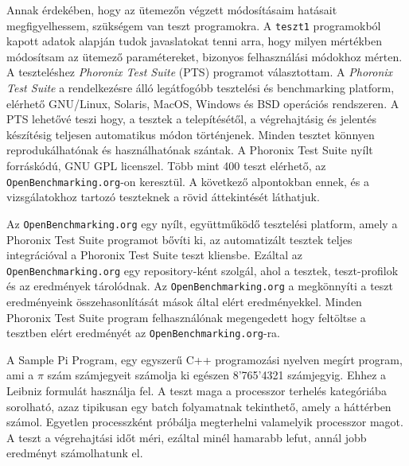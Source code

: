 

Annak érdekében, hogy az ütemezőn végzett módosításaim hatásait megfigyelhessem, szükségem van teszt programokra. A \texttt{teszt1} programokból kapott adatok alapján tudok javaslatokat tenni arra, hogy milyen mértékben módosítsam az ütemező paramétereket, bizonyos felhasználási módokhoz mérten.
A teszteléshez \textit{Phoronix Test Suite} (PTS) programot választottam.
A \textit{Phoronix Test Suite} a rendelkezésre álló legátfogóbb tesztelési és benchmarking platform, elérhető GNU/Linux, Solaris, MacOS, Windows és BSD operációs rendszeren.
A PTS lehetővé teszi hogy, a tesztek a telepítésétől, a végrehajtásig és jelentés készítésig teljesen automatikus módon történjenek.
Minden tesztet könnyen reprodukálhatónak és használhatónak szántak.
A Phoronix Test Suite nyílt forráskódú, GNU GPL licenszel.
Több mint 400 teszt elérhető, az \texttt{OpenBenchmarking.org}-on keresztül.
A következő alpontokban ennek, és a vizsgálatokhoz tartozó teszteknek a rövid áttekintését láthatjuk.


Az \texttt{OpenBenchmarking.org} egy nyílt, együttműködő tesztelési platform, amely a Phoronix Test Suite programot bővíti ki, az automatizált tesztek teljes integrációval a Phoronix Test Suite teszt kliensbe.
Ezáltal az \texttt{OpenBenchmarking.org} egy repository-ként szolgál, ahol a tesztek, teszt-profilok és az eredmények tárolódnak.
Az \texttt{OpenBenchmarking.org} a megkönnyíti a teszt eredményeink összehasonlítását mások által elért eredményekkel.
Minden Phoronix Test Suite program felhasználónak megengedett hogy feltöltse a tesztben elért eredményét az \texttt{OpenBenchmarking.org}-ra.


A  Sample Pi Program, egy egyszerű C++ programozási nyelven megírt program, ami a $\pi$ szám számjegyeit számolja ki egészen 8'765'4321 számjegyig. Ehhez a Leibniz formulát használja fel. A teszt maga a processzor terhelés kategóriába sorolható, azaz tipikusan egy batch folyamatnak tekinthető, amely a háttérben számol. Egyetlen processzként próbálja megterhelni valamelyik processzor magot. 
A teszt a végrehajtási időt méri, ezáltal minél hamarabb lefut, annál jobb eredményt számolhatunk el.

